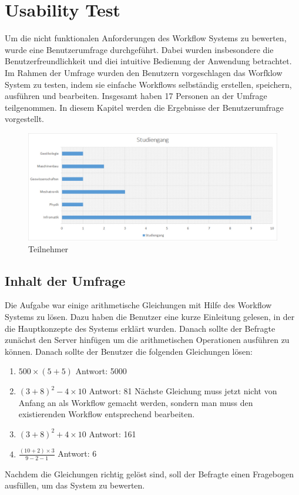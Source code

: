 \chapter{Usability Test}
Um die nicht funktionalen Anforderungen des Workflow Systems zu bewerten, wurde eine Benutzerumfrage durchgeführt. Dabei wurden insbesondere die Benutzerfreundlichkeit und diei intuitive  Bedienung der Anwendung betrachtet. Im Rahmen der Umfrage wurden den Benutzern vorgeschlagen das Worfklow System zu testen, indem sie einfache Workflows selbständig erstellen, speichern, ausführen und bearbeiten. Insgesamt haben 17 Personen an der Umfrage teilgenommen. In diesem Kapitel werden die Ergebnisse der Benutzerumfrage vorgestellt.

\begin{figure}[H]
    \centering
    \includegraphics[width=15cm]{diagrams/TeilnehmerDiagramm.jpg}
    \caption{Teilnehmer}
    \label{teilnehmer}
\end{figure}

\section{Inhalt der Umfrage}
Die Aufgabe war einige arithmetische Gleichungen mit Hilfe des Workflow Systems zu lösen. Dazu haben die Benutzer eine kurze Einleitung gelesen, in der die Hauptkonzepte des Systems erklärt wurden. Danach sollte der Befragte zunächst den Server hinfügen um die arithmetischen Operationen ausführen zu können.\newline
Danach sollte der Benutzer die folgenden Gleichungen lösen:

\begin{enumerate}
    \item \(500  \times (5 + 5)\) Antwort: 5000
    \item \((3 + 8)^2 - 4 \times 10\) Antwort: 81 \newline
    Nächste Gleichung muss jetzt nicht von Anfang an als Workflow gemacht werden, sondern man muss den existierenden Workflow entsprechend bearbeiten.
    \item \((3 + 8)^2 + 4 \times 10\) Antwort: 161
    \item \(\frac{(10 + 2) \times 3}{9 - 2 - 1}\) Antwort: 6
\end{enumerate}
Nachdem die Gleichungen richtig gelöst sind, soll der Befragte einen Fragebogen ausfüllen, um das System zu bewerten.



